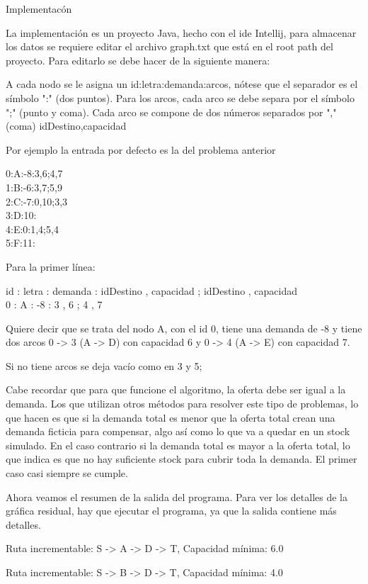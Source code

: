 \documentclass{article}
\begin{document}
\begin{section} {Implementacón}
	
	La implementación es un proyecto Java, hecho con el ide Intellij, para almacenar los datos se requiere editar el archivo graph.txt que está en el root path del proyecto. Para editarlo se debe hacer de la siguiente manera:
	
	A cada nodo se le asigna un id:letra:demanda:arcos, nótese que el separador es el símbolo ":" (dos puntos). Para los arcos, cada arco se debe separa por el símbolo ";" (punto y coma). Cada arco se compone de dos números separados por "," (coma) idDestino,capacidad
	
	Por ejemplo la entrada por defecto es la del problema anterior
	
	0:A:-8:3,6;4,7\\
	1:B:-6:3,7;5,9\\
	2:C:-7:0,10;3,3\\
	3:D:10:\\
	4:E:0:1,4;5,4\\
	5:F:11:
	
	Para la primer línea:
	
	id : letra : demanda : idDestino , capacidad ; idDestino , capacidad\\
	0 : A : -8 : 3 , 6 ; 4 , 7
	
	Quiere decir que se trata del nodo A, con el id 0, tiene una demanda de -8 y tiene dos arcos 0 -> 3 (A -> D) con capacidad 6 y 0 -> 4 (A -> E) con capacidad 7.
	
	Si no tiene arcos se deja vacío como en 3 y 5;
	
	Cabe recordar que para que funcione el algoritmo, la oferta debe ser igual a la demanda. Los que utilizan otros métodos para resolver este tipo de problemas, lo que hacen es que si la demanda total es menor que la oferta total crean una demanda ficticia para compensar, algo así como lo que va a quedar en un stock simulado. En el caso contrario si la demanda total es mayor a la oferta total, lo que indica es que no hay suficiente stock para cubrir toda la demanda. El primer caso casi siempre se cumple.
	
	Ahora veamos el resumen de la salida del programa. Para ver los detalles de la gráfica residual, hay que ejecutar el programa, ya que la salida contiene más detalles.
	
	Ruta incrementable: S -> A -> D -> T, Capacidad mínima: 6.0
	
	Ruta incrementable: S -> B -> D -> T, Capacidad mínima: 4.0
	

\end{section}
\end{document}
